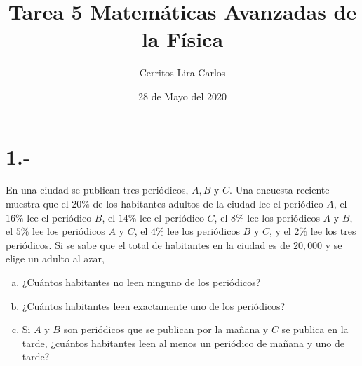 \documentclass{article}
\title{Tarea 5 Matemáticas Avanzadas de la Física}
\author{Cerritos Lira Carlos}
\date{28 de Mayo del 2020}
\begin{document}
\maketitle
\section*{1.-}
En una ciudad se publican tres periódicos, $A,B$ y $C$. Una encuesta reciente muestra que el $20\%$ 
de los habitantes adultos de la ciudad lee el periódico $A$, el $16\%$ lee el periódico $B$, 
el $14\%$ lee el periódico $C$, el $8\%$ lee los periódicos $A$ y $B$, el $5\%$ lee los periódicos $A$ y $C$, 
el $4\%$ lee los periódicos $B$ y $C$, y el $2\%$ lee los tres periódicos. 
Si se sabe que el total de habitantes en la ciudad es de $20,000$ y se elige un adulto al azar,
\begin{enumerate}[a)]
    \item ¿Cuántos habitantes no leen ninguno de los periódicos?
    \item ¿Cuántos habitantes leen exactamente uno de los periódicos?
    \item Si $A$ y $B$ son periódicos que se publican por la mañana y $C$ se publica en la tarde, 
    ¿cuántos habitantes leen al menos un periódico de mañana y uno de tarde?
\end{enumerate}
\end{document}
